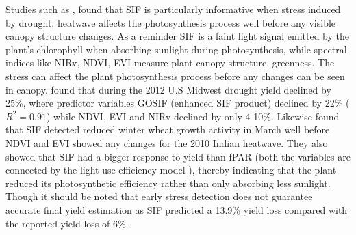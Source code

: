 Studies such as \cite{qiu2022monitoring}, \cite{song2018satellite} found that SIF is particularly informative when stress induced by drought, heatwave affects the photosynthesis process well before any visible canopy structure changes. As a reminder SIF is a faint light signal emitted by the plant's chlorophyll when absorbing sunlight during photosynthesis, while spectral indices like NIRv, NDVI, EVI measure plant canopy structure, greenness. The stress can affect the plant photosynthesis process before any changes can be seen in canopy. \cite{qiu2022monitoring} found that during the 2012 U.S Midwest drought yield declined by 25\%, where predictor variables GOSIF (enhanced SIF product) declined by 22\% ($R^2=0.91$) while NDVI, EVI and NIRv declined by only 4-10\%. Likewise \cite{song2018satellite} found that SIF detected reduced winter wheat growth activity in March well before NDVI and EVI showed any changes for the 2010 Indian heatwave. They also showed that SIF had a bigger response to yield than fPAR (both the variables are connected by the light use efficiency model \cite{liu2020estimating}), thereby indicating that the plant reduced its photosynthetic efficiency rather than only absorbing less sunlight. Though it should be noted that early stress detection does not guarantee accurate final yield estimation as SIF predicted a 13.9\% yield loss compared with the reported yield loss of 6\%. 

